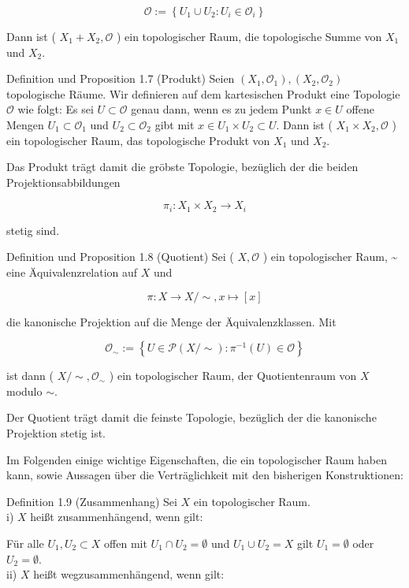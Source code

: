\documentclass[10pt, letterpaper]{article}
\begin{document}
$$
\mathcal{O}:=\left\{U_{1} \cup U_{2}: U_{i} \in \mathcal{O}_{i}\right\}
$$

Dann ist ( $X_{1}+X_{2}, \mathcal{O}$ ) ein topologischer Raum, die topologische Summe von $X_{1}$ und $X_{2}$.

Definition und Proposition 1.7 (Produkt) Seien $\left(X_{1}, \mathcal{O}_{1}\right),\left(X_{2}, \mathcal{O}_{2}\right)$ topologische Räume. Wir definieren auf dem kartesischen Produkt eine Topologie $\mathcal{O}$ wie folgt: Es sei $U \subset \mathcal{O}$ genau dann, wenn es zu jedem Punkt $x \in U$ offene Mengen $U_{1} \subset \mathcal{O}_{1}$ und $U_{2} \subset \mathcal{O}_{2}$ gibt mit $x \in U_{1} \times U_{2} \subset U$. Dann ist ( $X_{1} \times X_{2}, \mathcal{O}$ ) ein topologischer Raum, das topologische Produkt von $X_{1}$ und $X_{2}$.

Das Produkt trägt damit die gröbste Topologie, bezüglich der die beiden Projektionsabbildungen

$$
\pi_{i}: X_{1} \times X_{2} \rightarrow X_{i}
$$

stetig sind.

Definition und Proposition 1.8 (Quotient) Sei ( $X, \mathcal{O}$ ) ein topologischer Raum, \~{} eine Äquivalenzrelation auf $X$ und

$$
\pi: X \rightarrow X / \sim, x \mapsto[x]
$$

die kanonische Projektion auf die Menge der Äquivalenzklassen. Mit

$$
\mathcal{O}_{\sim}:=\left\{U \in \mathcal{P}(X / \sim): \pi^{-1}(U) \in \mathcal{O}\right\}
$$

ist dann ( $X / \sim, \mathcal{O}_{\sim}$ ) ein topologischer Raum, der Quotientenraum von $X$ modulo $\sim$.

Der Quotient trägt damit die feinste Topologie, bezüglich der die kanonische Projektion stetig ist.

Im Folgenden einige wichtige Eigenschaften, die ein topologischer Raum haben kann, sowie Aussagen über die Verträglichkeit mit den bisherigen Konstruktionen:

Definition 1.9 (Zusammenhang) Sei $X$ ein topologischer Raum.\\
i) $X$ heißt zusammenhängend, wenn gilt:

Für alle $U_{1}, U_{2} \subset X$ offen mit $U_{1} \cap U_{2}=\emptyset$ und $U_{1} \cup U_{2}=X$ gilt $U_{1}=\emptyset$ oder $U_{2}=\emptyset$.\\
ii) $X$ heißt wegzusammenhängend, wenn gilt:
\end{document}

